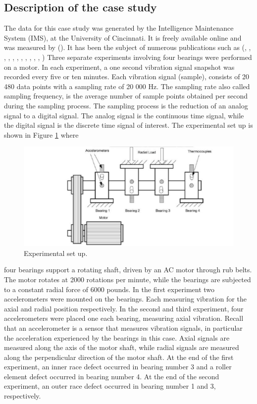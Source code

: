 \documentclass[../Main/thesis.tex]{subfiles}
\begin{document}
\subsection{Description of the case study}
\label{sec:case}
The data for this case study was generated by the Intelligence Maintenance System (IMS), at the University of Cincinnati. It is freely available online and was measured by (\cite{lee2007}). It has been the subject of numerous publications such as 
(\cite{hai2006}, \cite{mejia2010}, \cite{fangtao2011}, \cite{mejia2011}, \cite{mortada2011}, \cite{rego2011}, \cite{yacout2012}, \cite{sergey2012} , \cite{of2012}, \cite{jianbo2012a}, \cite{jianbo2012b}, \cite{mejia2012} )
\justify
Three separate experiments involving four bearings were performed on a motor. In each experiment, a one second vibration signal snapshot was recorded every five or ten minutes. Each vibration signal (sample), consists of 20 480 data points with a sampling rate of 20 000 Hz.
The sampling rate also called sampling frequency, is the average number of sample points obtained per second during the sampling process. The sampling process is the reduction of an analog signal to a digital signal. The analog signal is the continuous time signal, while the digital signal is the discrete time signal of interest. The experimental set up is shown in Figure \ref{fig:exp} where
\begin{figure}[H] %
   \centering
   \includegraphics[width=7in]{../fig/experiment} 
   \caption{Experimental set up.}
   \label{fig:exp}
\end{figure}
\justify
four bearings support a rotating shaft, driven by an AC motor through rub belts. The motor rotates at 2000 rotations per minute, while the bearings are subjected to a constant radial force of 6000 pounds. In the first experiment two accelerometers were mounted on the bearings. Each measuring vibration for the axial and radial position respectively.
In the second and third experiment, four accelerometers were placed one each bearing, measuring axial vibration.
Recall that an accelerometer is a sensor that measures vibration signals, in particular the acceleration experienced by the bearings in this case. Axial signals are measured along the axis of the motor shaft, while radial signals are measured along the perpendicular direction of the motor shaft.
\justify
At the end of the first experiment, an inner race defect occurred in bearing number 3 and a roller element defect occurred in bearing number 4. At the end of the second experiment, an outer race defect occurred in bearing number 1 and 3, respectively. 
\end{document}

